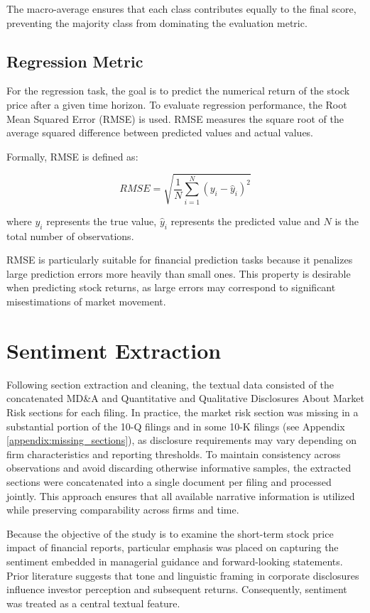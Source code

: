 The macro-average ensures that each class contributes equally to the final score, preventing the majority class from dominating the evaluation metric.

\subsection{Regression Metric}

For the regression task, the goal is to predict the numerical return of the stock price after a given time horizon.
To evaluate regression performance, the Root Mean Squared Error (RMSE) is used. RMSE measures the square root of the average squared difference between predicted values and actual values.

Formally, RMSE is defined as:

\begin{equation}
RMSE = \sqrt{\frac{1}{N} \sum_{i=1}^{N} (y_i - \hat{y}_i)^2}
\end{equation}

where $y_i$ represents the true value, $\hat{y}_i$ represents the predicted value and 
$N$ is the total number of observations.

RMSE is particularly suitable for financial prediction tasks because it penalizes large prediction errors more heavily than small ones. This property is desirable when predicting stock returns, as large errors may correspond to significant misestimations of market movement.

\section{Sentiment Extraction}

Following section extraction and cleaning, the textual data consisted of the concatenated MD\&A and Quantitative and Qualitative Disclosures About Market Risk sections for each filing. 
In practice, the market risk section was missing in a substantial portion of the 10-Q filings and in some 10-K filings (see Appendix \ref{appendix:missing_sections}), as disclosure requirements may vary depending on firm characteristics and reporting thresholds. 
To maintain consistency across observations and avoid discarding otherwise informative samples, the extracted sections were concatenated into a single document per filing and processed jointly. 
This approach ensures that all available narrative information is utilized while preserving comparability across firms and time.

Because the objective of the study is to examine the short-term stock price impact of financial reports, particular emphasis was placed on capturing the sentiment embedded in managerial guidance and forward-looking statements. 
Prior literature suggests that tone and linguistic framing in corporate disclosures influence investor perception and subsequent returns. 
Consequently, sentiment was treated as a central textual feature.

